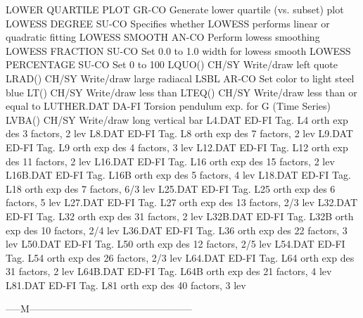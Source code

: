 LOWER QUARTILE PLOT         GR-CO Generate lower quartile (vs. subset) plot
LOWESS DEGREE               SU-CO Specifies whether LOWESS performs linear or quadratic fitting
LOWESS SMOOTH               AN-CO Perform lowess smoothing
LOWESS FRACTION             SU-CO Set 0.0 to 1.0 width for lowess smooth
LOWESS PERCENTAGE           SU-CO Set 0 to 100%
LQUO()                      CH/SY Write/draw left quote
LRAD()                      CH/SY Write/draw large radiacal
LSBL                        AR-CO Set color to light steel blue
LT()                        CH/SY Write/draw less than
LTEQ()                      CH/SY Write/draw less than or equal to
LUTHER.DAT                  DA-FI Torsion pendulum exp. for G (Time Series)
LVBA()                      CH/SY Write/draw long vertical bar
L4.DAT                      ED-FI Tag. L4   orth exp des  3 factors,   2 lev
L8.DAT                      ED-FI Tag. L8   orth exp des  7 factors,   2 lev
L9.DAT                      ED-FI Tag. L9   orth exp des  4 factors,   3 lev
L12.DAT                     ED-FI Tag. L12  orth exp des 11 factors,   2 lev
L16.DAT                     ED-FI Tag. L16  orth exp des 15 factors,   2 lev
L16B.DAT                    ED-FI Tag. L16B orth exp des  5 factors,   4 lev
L18.DAT                     ED-FI Tag. L18  orth exp des  7 factors, 6/3 lev
L25.DAT                     ED-FI Tag. L25  orth exp des  6 factors,   5 lev
L27.DAT                     ED-FI Tag. L27  orth exp des 13 factors, 2/3 lev
L32.DAT                     ED-FI Tag. L32  orth exp des 31 factors,   2 lev
L32B.DAT                    ED-FI Tag. L32B orth exp des 10 factors, 2/4 lev
L36.DAT                     ED-FI Tag. L36  orth exp des 22 factors,   3 lev
L50.DAT                     ED-FI Tag. L50  orth exp des 12 factors, 2/5 lev
L54.DAT                     ED-FI Tag. L54  orth exp des 26 factors, 2/3 lev
L64.DAT                     ED-FI Tag. L64  orth exp des 31 factors,   2 lev
L64B.DAT                    ED-FI Tag. L64B orth exp des 21 factors,   4 lev
L81.DAT                     ED-FI Tag. L81  orth exp des 40 factors,   3 lev

-----M--------------------------------------------------

